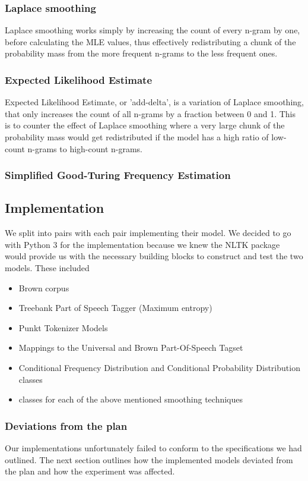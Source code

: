 \documentclass[a4paper,12pt]{article}
\begin{document}
\subsubsection{Laplace smoothing}
Laplace smoothing works simply by increasing the count of every n-gram by one, before calculating the MLE values, thus effectively redistributing a chunk of the probability mass from the more frequent n-grams to the less frequent ones.

\subsubsection{Expected Likelihood Estimate}
Expected Likelihood Estimate, or 'add-delta', is a variation of Laplace smoothing, that only increases the count of all n-grams by a fraction between 0 and 1. This is to counter the effect of Laplace smoothing where a very large chunk of the probability mass would get redistributed if the model has a high ratio of low-count n-grams to high-count n-grams.

\subsubsection{Simplified Good-Turing Frequency Estimation}


\subsection{Implementation}
\label{sec:impl}

We split into pairs with each pair implementing their model. We decided to go with Python 3 for the implementation because we knew the NLTK package would provide us with the necessary building blocks to construct and test the two models. These included
\begin{itemize}
\item Brown corpus
\item Treebank Part of Speech Tagger (Maximum entropy)
\item Punkt Tokenizer Models
\item Mappings to the Universal and Brown Part-Of-Speech Tagset
\item Conditional Frequency Distribution and Conditional Probability Distribution classes
\item classes for each of the above mentioned smoothing techniques
\end{itemize}

\subsubsection{Deviations from the plan}
Our implementations unfortunately failed to conform to the specifications we had outlined. The next section outlines how the implemented models deviated from the plan and how the experiment was affected.
\end{document}
